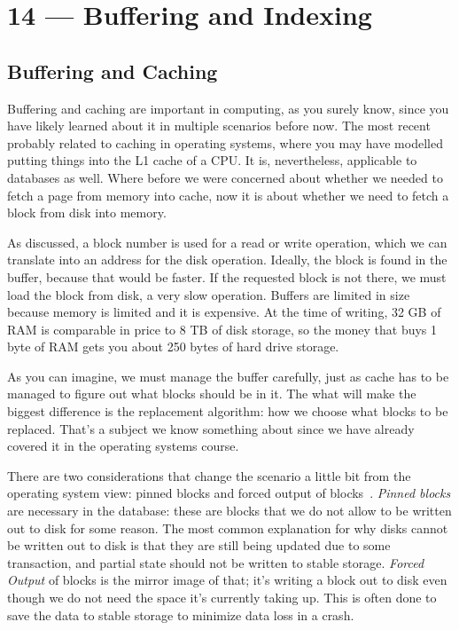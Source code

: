 \documentclass[a4paper]{report}
\begin{document}
\chapter*{14 --- Buffering and Indexing}


\section*{Buffering and Caching}

Buffering and caching are important in computing, as you surely know, since you have likely learned about it in multiple scenarios before now. The most recent probably related to caching in operating systems, where you may have modelled putting things into the L1 cache of a CPU. It is, nevertheless, applicable to databases as well. Where before we were concerned about whether we needed to fetch a page from memory into cache, now it is about whether we need to fetch a block from disk into memory.

As discussed, a block number is used for a read or write operation, which we can translate into an address for the disk operation. Ideally, the block is found in the buffer, because that would be faster. If the requested block is not there, we must load the block from disk, a very slow operation. Buffers are limited in size because memory is limited and it is expensive. At the time of writing, 32 GB of RAM is comparable in price to 8 TB of disk storage, so the money that buys 1 byte of RAM gets you about 250 bytes of hard drive storage.

As you can imagine, we must manage the buffer carefully, just as cache has to be managed to figure out what blocks should be in it. The what will make the biggest difference is the replacement algorithm: how we choose what blocks to be replaced. That's a subject we know something about since we have already covered it in the operating systems course.

There are two considerations that change the scenario a little bit from the operating system view: pinned blocks and forced output of blocks~\cite{dsc}. \textit{Pinned blocks} are necessary in the database: these are blocks that we do not allow to be written out to disk for some reason. The most common explanation for why disks cannot be written out to disk is that they are still being updated due to some transaction, and partial state should not be written to stable storage. \textit{Forced Output} of blocks is the mirror image of that; it's writing a block out to disk even though we do not need the space it's currently taking up. This is often done to save the data to stable storage to minimize data loss in a crash.
\end{document}
